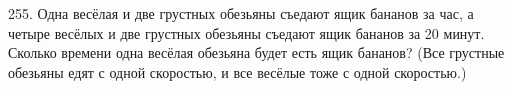 255. Одна весёлая и две грустных обезьяны съедают ящик бананов за час, а четыре весёлых и две грустных обезьяны съедают ящик бананов за 20 минут. Сколько времени одна весёлая обезьяна будет есть ящик бананов? (Все грустные обезьяны едят с одной скоростью, и все весёлые тоже с одной скоростью.)\\
